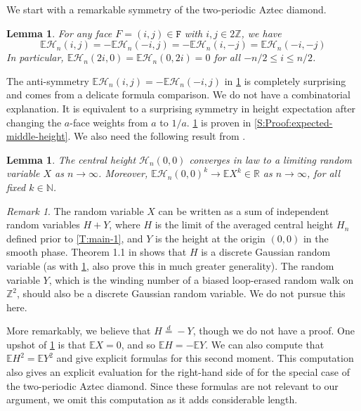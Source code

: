 \documentclass[11pt,twoside]{amsart}
\theoremstyle{plain}
\newtheorem{lem}[thm]{Lemma}
\numberwithin{quest}{section}
\theoremstyle{remark}
\newtheorem{rem}{Remark}
\numberwithin{rem}{section}
\theoremstyle{definition}
\newcommand{\Z}{\mathbb{Z}}
\newcommand{\N}{\mathbb{N}}
\newcommand{\R}{\mathbb{R}}
\newcommand{\E}{\mathbb{E}}
\newcommand{\cH}{\mathcal{H}}
\newcommand{\eqd}{\stackrel{d}{=}}
\renewcommand{\tt}[1]{{\mathtt{#1}}}
\begin{document}
	We start with a remarkable symmetry of the two-periodic Aztec diamond. 
    
	\begin{lem}
		\label{L:expected-middle-height}
		For any face $F = (i, j) \in \tt{F}$ with $i, j \in 2 \Z$, we have
		$$
		\E \mathcal{H}_n(i, j) = -\E \mathcal{H}_n(-i, j) = - \E \mathcal{H}_n(i, -j) = \E \mathcal{H}_n(-i, -j)
		$$
		In particular, $\E \mathcal{H}_n(2i,0) = \E \mathcal{H}_n(0,2i)= 0$ for all $-n/2 \le i \le n/2$.
	\end{lem}
	
	The anti-symmetry $\E \mathcal{H}_n(i, j) = - \E \mathcal{H}_n(-i, j)$ in \cref{L:expected-middle-height} is completely surprising and comes from a delicate formula comparison. We do not have a combinatorial explanation. It is equivalent to a surprising symmetry in height expectation after changing the $a$-face weights from $a$ to $1/a$. \cref{L:expected-middle-height} is proven in \cref{S:Proof:expected-middle-height}. 
	We also need the following result from \cite{BN25}.
	
	\begin{lem}{\cite[special case of Theorem 3.1]{BN25}}
		\label{L:variance-middle-height}
		The central height $\cH_n(0,0)$ converges in law to a limiting random variable $X$ as $n \to \infty$. Moreover, $\E \cH_n(0,0)^k \to \E X^k \in \R$ as $n \to \infty$, for all fixed $k \in \N$.
	\end{lem}
	
	\begin{rem}
		\label{R:discrete-gaussian}
		The random variable $X$ can be written as a sum of independent random variables $H + Y$, where $H$ is the limit of the averaged central height $H_n$ defined prior to \cref{T:main-1}, and $Y$ is the height at the origin $(0,0)$ in the smooth phase. Theorem 1.1 in \cite{BN25} shows that $H$ is a discrete Gaussian random variable (as with \cref{L:variance-middle-height}, \cite{BN25} also prove this in much greater generality). The random variable $Y$, which is the winding number of a biased loop-erased random walk on $\Z^2$, should also be a discrete Gaussian random variable. We do not pursue this here. 
		
		More remarkably, we believe that $H \eqd - Y$, though we do not have a proof. One upshot of \cref{L:expected-middle-height} is that $\E X = 0$, and so $\E H = - \E Y$. We can also compute that $\E H^2 = \E Y^2$ and give explicit formulas for this second moment. This computation also gives an explicit evaluation for the right-hand side of \cite[Equation (61)]{BN25} for the special case of the two-periodic Aztec diamond.  Since these formulas are not relevant to our argument, we omit this computation as it adds considerable length. 
	\end{rem}	
	
\end{document}
